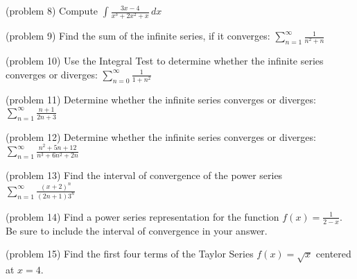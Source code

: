\documentclass[handout]{ximera}
\begin{document}
\begin{problem}(problem 8)
Compute $\displaystyle \int \frac{3x-4}{x^3 +2x^2 +x} \, dx$

\end{problem}



\begin{problem}(problem 9)
Find the sum of the infinite series, if it converges: $\displaystyle\sum_{n=1}^\infty \frac{1}{n^2 +n}$

\end{problem}




\begin{problem}(problem 10)
Use the Integral Test to determine whether the infinite series converges or diverges:  $\displaystyle \sum_{n=0}^\infty \frac{1}{1+n^2}$

\end{problem}

\begin{problem}(problem 11)
Determine whether the infinite series converges or diverges: $\displaystyle \sum_{n=1}^\infty \frac{n+1}{2n+3}$

\end{problem}





\begin{problem}(problem 12)
Determine whether the infinite series converges or diverges: $\displaystyle \sum_{n=1}^\infty \frac{n^2 + 5n + 12}{n^3 + 6n^2 + 2n}$

\end{problem}



\begin{problem}(problem 13)
Find the interval of convergence of the power series $\displaystyle{\sum_{n=1}^\infty \frac{(x+2)^n}{(2n+1)3^n}}$

\end{problem}


\begin{problem}(problem 14)
Find a power series representation for the function
$ \displaystyle f(x) = \frac{1}{2-x} $. Be sure to include the interval of convergence in your answer.

\end{problem}



\begin{problem}(problem 15)
Find the first four terms of the Taylor Series $f(x) = \sqrt x$ centered at $x = 4$.

\end{problem}
\end{document}
